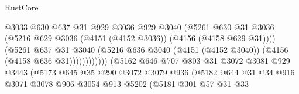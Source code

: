\begin{lexlean}{RustCore}
\begin{coremodule}
                                            @3033
                                            @630
                                            @637
                                            @31
                                            @929
                                            @3036
                                            @929
                                            @3040
                                            (@5261
                                              @630
                                              @31
                                              @3036
                                              (@5216
                                                @629
                                                @3036
                                                (@4151 (@4152 @3036))
                                                (@4156 (@4158 @629 @31))))
                                            (@5261
                                              @637
                                              @31
                                              @3040
                                              (@5216
                                                @636
                                                @3040
                                                (@4151 (@4152 @3040))
                                                (@4156 (@4158 @636 @31))))))))))))
                            (@5162
                              @646
                              @707
                              @803
                              @31
                              @3072
                              @3081
                              @929
                              @3443
                              (@5173
                                @645
                                @35
                                @290
                                @3072
                                @3079
                                @936
                                (@5182
                                  @644
                                  @31
                                  @34
                                  @916
                                  @3071
                                  @3078
                                  @906
                                  @3054
                                  @913
                                  @5202
                                  (@5181
                                    @301
                                    @57
                                    @31
                                    @33

\end{coremodule}
\end{lexlean}
